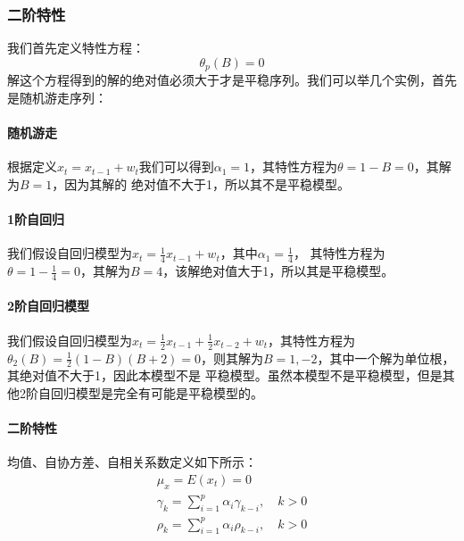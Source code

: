 \documentclass{article}
\begin{document}
\subsubsection{二阶特性}
我们首先定义特性方程：
\begin{equation}
\theta _{p}(B)=0
\label{e000028}
\end{equation}
解这个方程得到的解的绝对值必须大于才是平稳序列。我们可以举几个实例，首先是随机游走序列：
\paragraph{随机游走}
根据定义$x_{t}=x_{t-1}+w_{t}$我们可以得到$\alpha _1=1$，其特性方程为$\theta=1-B=0$，其解为$B=1$，因为其解的
绝对值不大于1，所以其不是平稳模型。
\paragraph{1阶自回归}
我们假设自回归模型为$x_{t}=\frac{1}{4}x_{t-1}+w_{t}$，其中$\alpha _1=\frac{1}{4}$，
其特性方程为$\theta = 1-\frac{1}{4}=0$，其解为$B=4$，该解绝对值大于1，所以其是平稳模型。
\paragraph{2阶自回归模型}
我们假设自回归模型为$x_{t}=\frac{1}{2}x_{t-1}+\frac{1}{2}x_{t-2}+w_{t}$，其特性方程为
$\theta _2(B)=\frac{1}{2}(1-B)(B+2)=0$，则其解为$B=1,-2$，其中一个解为单位根，其绝对值不大于1，因此本模型不是
平稳模型。虽然本模型不是平稳模型，但是其他2阶自回归模型是完全有可能是平稳模型的。
\paragraph{二阶特性}
均值、自协方差、自相关系数定义如下所示：
\begin{equation}
\begin{aligned}
\mu _{x}=E(x_{t})=0 \\
\gamma _{k}=\sum_{i=1}^{p}\alpha _{i} \gamma _{k-i}, \quad k>0 \\
\rho _{k} = \sum_{i=1}^{p}\alpha _{i} \rho _{k-i}, \quad k>0
\end{aligned}
\label{e000029}
\end{equation}
\end{document}
